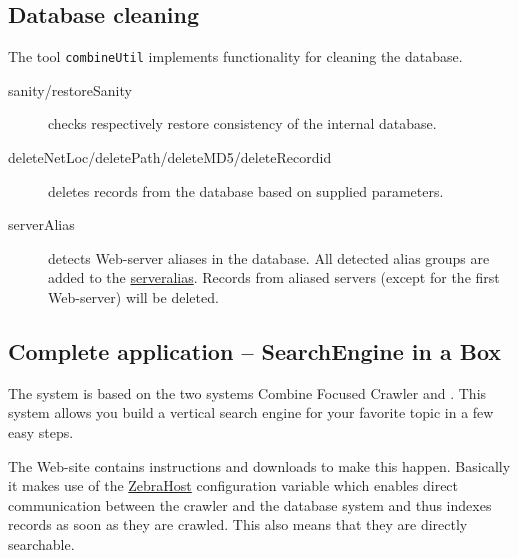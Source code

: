 \subsection{Database cleaning}

The tool {\tt combineUtil} implements functionality for cleaning the database.

\begin{description}
\item[sanity/restoreSanity] checks respectively restore
 consistency of the internal database.

\item[deleteNetLoc/deletePath/deleteMD5/deleteRecordid] deletes
records from the data\-base based on supplied parameters.

\item[serverAlias] detects Web-server aliases in the database.
All detected alias groups are added to the \hyperref{serveralias configuration}{serveralias configuration (section }{)}{serveralias}.
Records from aliased servers (except for the first Web-server) will be deleted.
\end{description}

\subsection{Complete application -- SearchEngine in a Box}

The
 system is based on the two systems Combine Focused Crawler and
 . This system allows you build
 a vertical search engine for your favorite topic in a few easy
 steps.

The  Web-site contains instructions and downloads
to make this happen. Basically it makes use of the
\hyperref{ZebraHost}{ZebraHost (see section }{)}{ZebraHost}
configuration variable which enables direct communication between
the crawler and the database system and thus indexes records as soon
as they are crawled. This also means that they are directly searchable.
